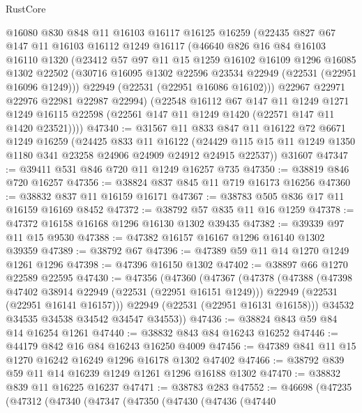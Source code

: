 \begin{lexlean}{RustCore}
\begin{coremodule}
    @16080
    @830
    @848
    @11
    @16103
    @16117
    @16125
    @16259
    (@22435
      @827
      @67
      @147
      @11
      @16103
      @16112
      @1249
      @16117
      (@46640
        @826
        @16
        @84
        @16103
        @16110
        @1320
        (@23412
          @57
          @97
          @11
          @15
          @1259
          @16102
          @16109
          @1296
          @16085
          @1302
          @22502
          (@30716 @16095 @1302 @22596 @23534 @22949 (@22531 (@22951 @16096 @1249)))
          @22949
          (@22531 (@22951 @16086 @16102)))
        @22967
        @22971
        @22976
        @22981
        @22987
        @22994)
      (@22548
        @16112
        @67
        @147
        @11
        @1249
        @1271
        @1249
        @16115
        @22598
        (@22561 @147 @11 @1249 @1420 (@22571 @147 @11 @1420 @23521))))
@47340 := @31567
    @11
    @833
    @847
    @11
    @16122
    @72
    @6671
    @1249
    @16259
    (@24425
      @833
      @11
      @16122
      (@24429 @115 @15 @11 @1249 @1350 @1180 @341 @23258 @24906 @24909 @24912 @24915 @22537))
    @31607
@47347 := @39411 @531 @846 @720 @11 @1249 @16257 @735
@47350 := @38819 @846 @720 @16257
@47356 := @38824 @837 @845 @11 @719 @16173 @16256
@47360 := @38832 @837 @11 @16159 @16171
@47367 := @38783 @505 @836 @17 @11 @16159 @16169 @8452
@47372 := @38792 @57 @835 @11 @16 @1259
@47378 := @47372 @16158 @16168 @1296 @16130 @1302 @39435
@47382 := @39339 @97 @11 @15 @9530
@47388 := @47382 @16157 @16167 @1296 @16140 @1302 @39359
@47389 := @38792 @67
@47396 := @47389 @59 @11 @14 @1270 @1249 @1261 @1296
@47398 := @47396 @16150 @1302
@47402 := @38897 @66 @1270 @22589 @22595
@47430 := @47356
    (@47360
      (@47367
        (@47378
          (@47388
            (@47398 @47402 @38914 @22949 (@22531 (@22951 @16151 @1249)))
            @22949
            (@22531 (@22951 @16141 @16157)))
          @22949
          (@22531 (@22951 @16131 @16158)))
        @34532
        @34535
        @34538
        @34542
        @34547
        @34553))
@47436 := @38824 @843 @59 @84 @14 @16254 @1261
@47440 := @38832 @843 @84 @16243 @16252
@47446 := @44179 @842 @16 @84 @16243 @16250 @4009
@47456 := @47389 @841 @11 @15 @1270 @16242 @16249 @1296 @16178 @1302 @47402
@47466 := @38792 @839 @59 @11 @14 @16239 @1249 @1261 @1296 @16188 @1302
@47470 := @38832 @839 @11 @16225 @16237
@47471 := @38783 @283
@47552 := @46698
    (@47235
      (@47312
        (@47340
          (@47347
            (@47350
              (@47430
                (@47436
                  (@47440

\end{coremodule}
\end{lexlean}
